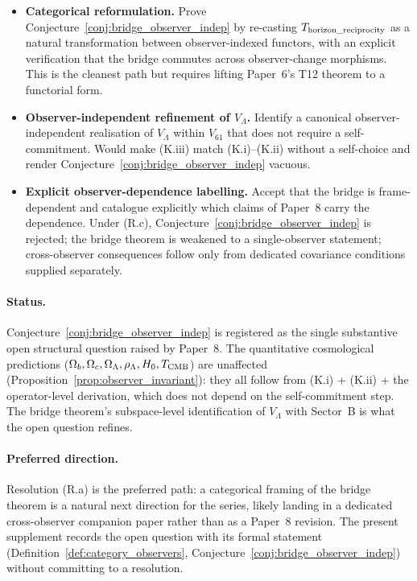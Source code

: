 \documentclass[11pt]{article}
\theoremstyle{plain}
\theoremstyle{definition}
\theoremstyle{remark}
\begin{document}
\begin{itemize}[leftmargin=2em,itemsep=3pt]
  \item[\textbf{(R.a)}]  \textbf{Categorical reformulation.}  Prove Conjecture~\ref{conj:bridge_observer_indep} by re-casting $T_{\rm horizon\_reciprocity}$ as a natural transformation between observer-indexed functors, with an explicit verification that the bridge commutes across observer-change morphisms.  This is the cleanest path but requires lifting Paper~6's T12 theorem to a functorial form.
  \item[\textbf{(R.b)}]  \textbf{Observer-independent refinement of $V_\Lambda$.}  Identify a canonical observer-independent realisation of $V_\Lambda$ within $V_{61}$ that does not require a self-commitment.  Would make (K.iii) match (K.i)--(K.ii) without a self-choice and render Conjecture~\ref{conj:bridge_observer_indep} vacuous.
  \item[\textbf{(R.c)}]  \textbf{Explicit observer-dependence labelling.}  Accept that the bridge is frame-dependent and catalogue explicitly which claims of Paper~8 carry the dependence.  Under (R.c), Conjecture~\ref{conj:bridge_observer_indep} is rejected; the bridge theorem is weakened to a single-observer statement; cross-observer consequences follow only from dedicated covariance conditions supplied separately.
\end{itemize}

\paragraph{Status.}  Conjecture~\ref{conj:bridge_observer_indep} is registered as the single substantive open structural question raised by Paper~8.  The quantitative cosmological predictions ($\Omega_b, \Omega_c, \Omega_\Lambda, \rho_\Lambda, H_0, T_{\rm CMB}$) are unaffected (Proposition~\ref{prop:observer_invariant}): they all follow from (K.i) + (K.ii) + the operator-level derivation, which does not depend on the self-commitment step.  The bridge theorem's subspace-level identification of $V_\Lambda$ with Sector~B is what the open question refines.

\paragraph{Preferred direction.}  Resolution (R.a) is the preferred path: a categorical framing of the bridge theorem is a natural next direction for the series, likely landing in a dedicated cross-observer companion paper rather than as a Paper~8 revision.  The present supplement records the open question with its formal statement (Definition~\ref{def:category_observers}, Conjecture~\ref{conj:bridge_observer_indep}) without committing to a resolution.
\end{document}
